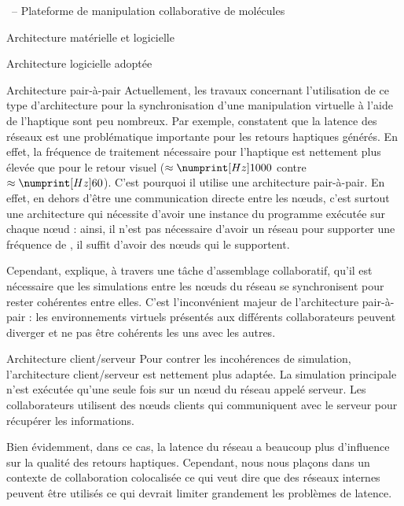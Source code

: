 \documentclass[myfrancais,ngerman,english,frenchb]{mythesis}
\begin{document}
\begin{mychapter}{\myShaddock\ -- Plateforme de manipulation collaborative de molécules}
\begin{mysection}{Architecture matérielle et logicielle}
\begin{mysubsection}{Architecture logicielle adoptée}
\begin{mysubsubsection}{Architecture pair-à-pair}
					Actuellement, les travaux concernant l'utilisation de ce type d'architecture pour la synchronisation d'une manipulation virtuelle à l'aide de l'haptique sont peu nombreux.
					Par exemple,  constatent que la latence des réseaux est une problématique importante pour les retours haptiques générés.
					En effet, la fréquence de traitement nécessaire pour l'haptique est nettement plus élevée que pour le retour visuel ($\approx \mynum[Hz]{1000}$ contre $\approx \mynum[Hz]{60}$).
					C'est pourquoi il utilise une architecture pair-à-pair.
					En effet, en dehors d'être une communication directe entre les nœuds, c'est surtout une architecture qui nécessite d'avoir une instance du programme exécutée sur chaque nœud : ainsi, il n'est pas nécessaire d'avoir un réseau pour supporter une fréquence de , il suffit d'avoir des nœuds qui le supportent.

					Cependant,  explique, à travers une tâche d'assemblage collaboratif, qu'il est nécessaire que les simulations entre les nœuds du réseau se synchronisent pour rester cohérentes entre elles.
					C'est l'inconvénient majeur de l'architecture pair-à-pair : les environnements virtuels présentés aux différents collaborateurs peuvent diverger et ne pas être cohérents les uns avec les autres.
				\end{mysubsubsection}
				\begin{mysubsubsection}{Architecture client/serveur}
					Pour contrer les incohérences de simulation, l'architecture client/serveur est nettement plus adaptée.
					La simulation principale n'est exécutée qu'une seule fois sur un nœud du réseau appelé serveur.
					Les collaborateurs utilisent des nœuds clients qui communiquent avec le serveur pour récupérer les informations.

					Bien évidemment, dans ce cas, la latence du réseau a beaucoup plus d'influence sur la qualité des retours haptiques.
					Cependant, nous nous plaçons dans un contexte de collaboration colocalisée ce qui veut dire que des réseaux internes peuvent être utilisés ce qui devrait limiter grandement les problèmes de latence.


\end{mysubsubsection}
\end{mysubsection}
\end{mysection}
\end{mychapter}
\end{document}
